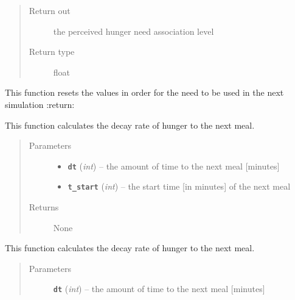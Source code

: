 \documentclass[letterpaper,10pt,english]{sphinxmanual}
\begin{document}
\begin{fulllineitems}
\begin{fulllineitems}
\begin{quote}
\begin{description}
\item[{Return out}] \leavevmode
the perceived hunger need association level

\item[{Return type}] \leavevmode
float

\end{description}\end{quote}

\end{fulllineitems}


\begin{fulllineitems}
\label{hunger:hunger.Hunger.reset}
This function resets the values in order for the need to be used in the next simulation
:return:

\end{fulllineitems}


\begin{fulllineitems}
\label{hunger:hunger.Hunger.set_decay_rate}
This function calculates the decay rate of hunger to the next meal.
\begin{quote}\begin{description}
\item[{Parameters}] \leavevmode\begin{itemize}
\item {} 
\textbf{\texttt{dt}} (\emph{int}) -- the amount of time to the next meal {[}minutes{]}

\item {} 
\textbf{\texttt{t\_start}} (\emph{int}) -- the start time {[}in minutes{]} of the next meal

\end{itemize}

\item[{Returns}] \leavevmode
None

\end{description}\end{quote}

\end{fulllineitems}


\begin{fulllineitems}
\label{hunger:hunger.Hunger.set_decay_rate_new}
This function calculates the decay rate of hunger to the next meal.
\begin{quote}\begin{description}
\item[{Parameters}] \leavevmode
\textbf{\texttt{dt}} (\emph{int}) -- the amount of time to the next meal {[}minutes{]}


\end{description}
\end{quote}
\end{fulllineitems}
\end{fulllineitems}
\end{document}
